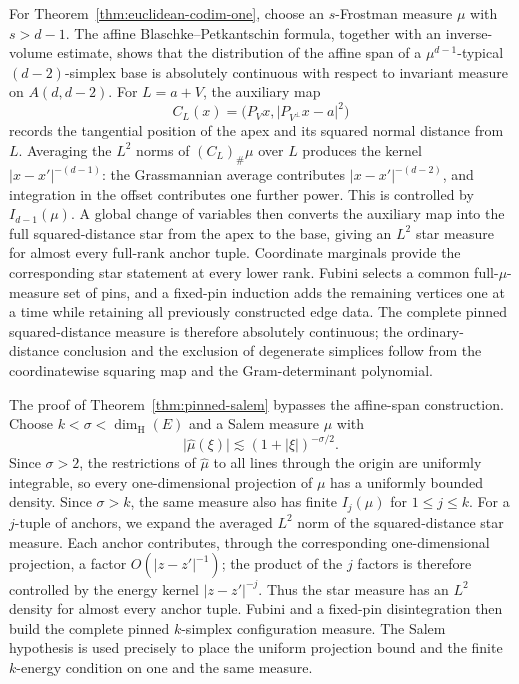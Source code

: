 \documentclass[11pt]{article}
\theoremstyle{remark}
\newcommand{\wh}{\widehat}
\numberwithin{equation}{section}
\newcommand{\1}{\mathbf 1}
\begin{document}
For Theorem~\ref{thm:euclidean-codim-one}, choose an \(s\)-Frostman
measure \(\mu\) with \(s>d-1\).  The affine
Blaschke--Petkantschin formula, together with an inverse-volume
estimate, shows that the distribution of the affine span of a
\(\mu^{d-1}\)-typical \((d-2)\)-simplex base is absolutely continuous
with respect to invariant measure on \(A(d,d-2)\).  For
\(L=a+V\), the auxiliary map
\[
        C_L(x)=\bigl(P_Vx,\lvert P_{V^\perp}x-a\rvert^2\bigr)
\]
records the tangential position of the apex and its squared normal
distance from \(L\).  Averaging the \(L^2\) norms of
\((C_L)_\#\mu\) over \(L\) produces the kernel
\(\lvert x-x'\rvert^{-(d-1)}\): the Grassmannian average contributes
\(\lvert x-x'\rvert^{-(d-2)}\), and integration in the offset
contributes one further power.  This is controlled by
\(I_{d-1}(\mu)\).  A global change of variables then converts the
auxiliary map into the full squared-distance star from the apex to
the base, giving an \(L^2\) star measure for almost every full-rank
anchor tuple.  Coordinate marginals provide the corresponding star
statement at every lower rank.  Fubini selects a common
full-\(\mu\)-measure set of pins, and a fixed-pin induction adds the
remaining vertices one at a time while retaining all previously
constructed edge data.  The complete pinned squared-distance measure
is therefore absolutely continuous; the ordinary-distance conclusion
and the exclusion of degenerate simplices follow from the
coordinatewise squaring map and the Gram-determinant polynomial.

The proof of Theorem~\ref{thm:pinned-salem} bypasses the affine-span
construction.  Choose
\(k<\sigma<\dim_{\mathrm H}(E)\) and a Salem measure \(\mu\) with
\[
        \lvert\wh\mu(\xi)\rvert
        \lesssim
        (1+\lvert\xi\rvert)^{-\sigma/2}.
\]
Since \(\sigma>2\), the restrictions of \(\wh\mu\) to all lines
through the origin are uniformly integrable, so every
one-dimensional projection of \(\mu\) has a uniformly bounded
density.  Since \(\sigma>k\), the same measure also has finite
\(I_j(\mu)\) for \(1\leq j\leq k\).  For a \(j\)-tuple of anchors, we
expand the averaged \(L^2\) norm of the squared-distance star measure.
Each anchor contributes, through the corresponding one-dimensional
projection, a factor \(O(\lvert z-z'\rvert^{-1})\); the product of the
\(j\) factors is therefore controlled by the energy kernel
\(\lvert z-z'\rvert^{-j}\).  Thus the star measure has an \(L^2\)
density for almost every anchor tuple.  Fubini and a fixed-pin
disintegration then build the complete pinned \(k\)-simplex
configuration measure.  The Salem hypothesis is used precisely to
place the uniform projection bound and the finite \(k\)-energy
condition on one and the same measure.
\end{document}
